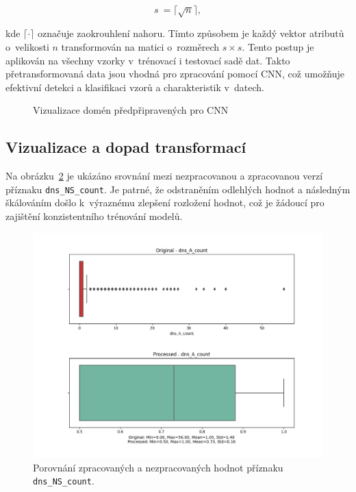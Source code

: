 \[
s~= \lceil \sqrt{n} \rceil,
\]

kde $\lceil \cdot \rceil$ označuje zaokrouhlení nahoru. Tímto způsobem je každý vektor atributů o~velikosti $n$ transformován na matici o~rozměrech $s \times s$. Tento postup je aplikován na všechny vzorky v~trénovací i testovací sadě dat. Takto přetransformovaná data jsou vhodná pro zpracování pomocí CNN, což umožňuje efektivní detekci a klasifikaci vzorů a charakteristik v~datech.


\begin{figure}[h!]
  \begin{center}
  \caption{Vizualizace domén předpřipravených pro CNN}
  \end{center}\label{image:cnn}
\end{figure}



\subsection{Vizualizace a dopad transformací}

Na obrázku~\ref{fig:features1} je ukázáno srovnání mezi nezpracovanou a zpracovanou verzí příznaku \texttt{dns\_NS\_count}. Je patrné, že odstraněním odlehlých hodnot a následným škálováním došlo k~výraznému zlepšení rozložení hodnot, což je žádoucí pro zajištění konzistentního trénování modelů.

\begin{figure}[h!]
    \centering
    \includegraphics[width=1.0\textwidth]{obrazky-figures/features_1.png}
    \caption{Porovnání zpracovaných a nezpracovaných hodnot příznaku \texttt{dns\_NS\_count}.}
    \label{fig:features1}
\end{figure}


